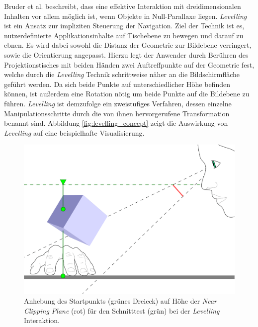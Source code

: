 Bruder et al. \cite{bruder:2013} beschreibt, dass eine effektive Interaktion mit dreidimensionalen Inhalten vor allem möglich ist, wenn Objekte in Null-Parallaxe liegen. \emph{Levelling} ist ein Ansatz zur impliziten Steuerung der Navigation. Ziel der Technik ist es, nutzerdefinierte Applikationsinhalte auf Tischebene zu bewegen und darauf zu ebnen. Es wird dabei sowohl die Distanz der Geometrie zur Bildebene verringert, sowie die Orientierung angepasst. Hierzu legt der Anwender durch Berühren des Projektionstisches mit beiden Händen zwei Auftreffpunkte auf der Geometrie fest, welche durch die \emph{Levelling} Technik schrittweise näher an die Bildschirmfläche geführt werden. Da sich beide Punkte auf unterschiedlicher Höhe befinden können, ist außerdem eine Rotation nötig um beide Punkte auf die Bildebene zu führen. \emph{Levelling} ist demzufolge ein zweistufiges Verfahren, dessen einzelne Manipulationsschritte durch die von ihnen hervorgerufene Transformation benannt sind. Abbildung \ref{fig:levelling_concept} zeigt die Auswirkung von \emph{Levelling} auf eine beispielhafte Visualisierung.

\begin{figure}
	\begin{center}
		\includegraphics[width=12cm]{img/intersection_lift.pdf}
	\end{center}
	\caption{Anhebung des Startpunkts (grünes Dreieck) auf Höhe der \emph{Near Clipping Plane} (rot) für den Schnitttest (grün) bei der \emph{Levelling} Interaktion.} 
	\label{fig:intersection_lift}
\end{figure}

